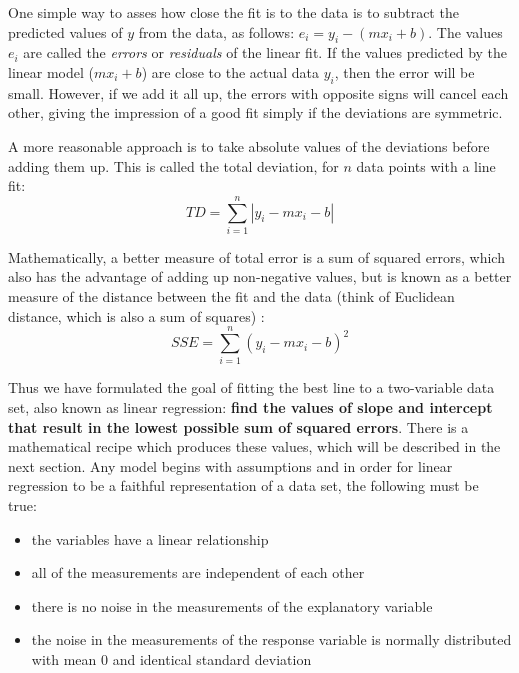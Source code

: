 \documentclass[
]{book}
\theoremstyle{definition}
\theoremstyle{definition}
\theoremstyle{definition}
\theoremstyle{remark}
\begin{document}
One simple way to asses how close the fit is to the data is to subtract the predicted values of \(y\) from the data, as follows: \(e_i = y_i - (mx_i + b)\). The values \(e_i\) are called the \emph{errors} or  \emph{residuals} of the linear fit. If the values predicted by the linear model (\(mx_i+b\)) are close to the actual data \(y_i\), then the error will be small. However, if we add it all up, the errors with opposite signs will cancel each other, giving the impression of a good fit simply if the deviations are symmetric.

A more reasonable approach is to take absolute values of the deviations before adding them up. This is called the total deviation, for \(n\) data points with a line fit:
\[ TD = \sum_{i=1}^n |  y_i - mx_i - b | \]

Mathematically, a better measure of total error is a sum of squared errors, which also has the advantage of adding up non-negative values, but is known as a better measure of the distance between the fit and the data (think of Euclidean distance, which is also a sum of squares) :
\[ SSE = \sum_{i=1}^n ( y_i - mx_i - b )^2 \]

Thus we have formulated the goal of fitting the best line to a two-variable data set, also known as linear regression: \textbf{find the values of slope and intercept that result in the lowest possible sum of squared errors}. There is a mathematical recipe which produces these values, which will be described in the next section. Any model begins with  assumptions and in order for linear regression to be a faithful representation of a data set, the following must be true:

\begin{itemize}
\item
  the variables have a linear relationship
\item
  all of the measurements are independent of each other
\item
  there is no noise in the measurements of the explanatory variable
\item
  the noise in the measurements of the response variable is normally distributed with mean 0 and identical standard deviation
\end{itemize}
\end{document}
